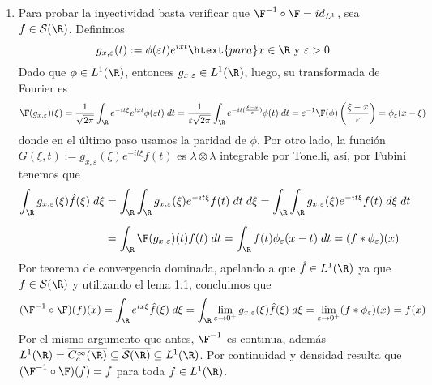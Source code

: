 \documentclass{article}
\begin{document}
\begin{enumerate}
    \begin{enumerate}
        \item Para probar la inyectividad basta verificar que $\F^{-1}\circ\F=id_{L^{1}}$, sea 
        $f\in\mathcal{S}(\R)$. Definimos
        \begin{equation*}
            g_{x,\varepsilon}(t):=\phi(\varepsilon t)e^{ixt}
            \htext{para}x\in\R\text{ y }\varepsilon>0
        \end{equation*}
        Dado que $\phi\in L^{1}(\R)$, entonces $g_{x,\varepsilon}\in L^{1}(\R)$, luego, su 
        transformada de Fourier es
        \begin{equation*}
            \F(g_{x,\varepsilon})(\xi)
            =\frac{1}{\sqrt{2\pi}}\int_{\R}e^{-it\xi}e^{ixt}\phi(\varepsilon t)\hspace{1mm}dt
            =\frac{1}{\varepsilon\sqrt{2\pi}}
            \int_{\R}e^{-it(\frac{\xi-x}{\varepsilon})}\phi(t)\hspace{1mm}dt
            =\varepsilon^{-1}\F(\phi)\left(\frac{\xi-x}{\varepsilon}\right)
            =\phi_{\varepsilon}(x-\xi)
        \end{equation*}
        donde en el último paso usamos la paridad de $\phi$. Por otro lado, la función $G(\xi,t)
        :=g_{x,\varepsilon}(\xi)e^{-it\xi}f(t)$ es $\lambda\otimes\lambda$ integrable por Tonelli, 
        así, por Fubini tenemos que
        \begin{align*}
            \int_{\R}g_{x,\varepsilon}(\xi)\hat{f}(\xi)\hspace{1mm}d\xi
            &= \int_{\R}\int_{\R}
            g_{x,\varepsilon}(\xi)e^{-it\xi}f(t)\hspace{1mm}dt\hspace{1mm}d\xi
            =\int_{\R}\int_{\R}g_{x,\varepsilon}(\xi)e^{-it\xi}f(t)\hspace{1mm}d\xi\hspace{1mm}dt 
            \\[2mm]
            &= \int_{\R}\F(g_{x,\varepsilon})(t)f(t)\hspace{1mm}dt
            =\int_{\R}f(t)\phi_{\varepsilon}(x-t)\hspace{1mm}dt=(f*\phi_{\varepsilon})(x)
        \end{align*}
        Por teorema de convergencia dominada, apelando a que $\hat{f}\in L^{1}(\R)$ ya que 
        $f\in\mathcal{S}(\R)$ y utilizando el lema 1.1, concluimos que
        \begin{equation*}
            (\F^{-1}\circ\F)(f)(x)=\int_{\R}e^{ix\xi}\hat{f}(\xi)\hspace{1mm}d\xi
            =\int_{\R}\lim\limits_{\varepsilon\to0^{+}}
            g_{x,\varepsilon}(\xi)\hat{f}(\xi)\hspace{1mm}d\xi
            =\lim\limits_{\varepsilon\to0^{+}}(f*\phi_{\varepsilon})(x)=f(x)
        \end{equation*}
        Por el mismo argumento que antes, $\F^{-1}$ es continua, además 
        $L^{1}(\R)=\overline{C_{c}^{\infty}(\R)}\subseteq\overline{\mathcal{S}(\R)}
        \subseteq L^{1}(\R)$. Por continuidad y densidad resulta que $(\F^{-1}\circ\F)(f)=f$ 
        para toda $f\in L^{1}(\R)$.
        

\end{enumerate}
\end{enumerate}
\end{document}
